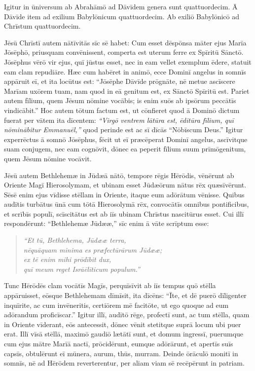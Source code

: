 \Versus Igitur in ūniversum ab Abrahāmō ad Dāvīdem genera sunt quattuordecim. Ā Dāvīde item ad exilium Babylōnicum quattuordecim. Ab exiliō Babylōnicō ad Chrīstum quattuordecim.

\Versus Jēsū Chrīstī autem nātīvitās sīc sē habet: Cum esset dēspōnsa māter ejus Marīa Jōsēphō, priusquam convēnissent, comperta est uterum ferre ex Spīritū Sānctō. 
\Versus Jōsē\-phus vērō vir ejus, quī jūstus esset, nec in eam vellet exemplum ēdere, statuit eam clam repudiāre. 
\Versus Hæc cum habēret in animō, ecce Dominī angelus in somnīs appāruit eī, et ita locūtus est: ``Jōsēphe Dāvīde prōgnāte, nē metue ascīscere Marīam uxōrem tuam, nam quod in eā genitum est, ex Sānctō Spīritū est. 
\Versus Pariet autem fīlium, quem Jēsum nōmine vocābis; is enim suōs ab ipsōrum peccātīs vindicābit.'' 
\Versus Hoc autem tōtum factum est, ut cōnfieret quod ā Dominō dictum fuerat per vātem ita dīcentem: 
\Versus \emph{``Virgō ventrem lātūra est, ēditūra fīlium, quī nōminābitur Emmanuēl,''} quod perinde est ac sī dīcās ``Nōbīscum Deus.'' 
\Versus Igitur experrēctus ā somnō Jōsēphus, fēcit ut eī præcēperat Dominī angelus, ascīvitque suam conjugem, 
\Versus nec eam cognōvit, dōnec ea peperit fīlium suum prīmōgenitum, quem Jēsum nōmine vocāvit.
 

\Caput
\Versus Jēsū autem Bethlehemæ in Jūdæā nātō, tempore rēgis Hērōdis, vēnērunt ab Oriente Magī Hierosolymam, 
\Versus et ubinam esset Jūdæōrum nātus rēx quæsīvērunt. Sēsē enim ejus vīdisse stēllam in Oriente, itaque eum adōrātum vēnisse. 
\Versus Quibus audītis turbātus ūnā cum tōtā Hierosolymā rēx, 
\Versus convocātīs omnibus pontificibus, et scrībīs populī, scīscitātus est ab iīs ubinam Chrīstus nascitūrus esset. 
\Versus Cui illī respondērunt: ``Bethlehemæ Jūdææ,'' sīc enim ā vāte scrīptum esse:

\begin{verse}
\begin{patverse*}
\Versus \emph{``Et tū, Bethlehema, Jūdææ terra,\\
nēquāquam minima es præfectūrārum Jūdææ;\\
ex tē enim mihi prōdībit dux,\\
quī meum reget Isrāēlīticum populum.''}
\end{patverse*}
\end{verse}

\Versus Tunc Hērōdēs clam vocātīs Magīs, perquīsīvit ab iīs tempus quō stēlla appāruisset, 
\Versus eōsque Bethlehemam dīmīsit, ita dīcēns: ``Īte, et dē puerō dīligenter inquīrite, ac cum invēneritis, certiōrem mē facitōte, ut ego quoque ad eum adōrandum proficīscar.'' 
\Versus Igitur illī, audītō rēge, profectī sunt, ac tum stēlla, quam in Oriente vīderant, eōs antecessit, dōnec vēnit stetitque suprā locum ubi puer erat. 
\Versus Illī vīsā stēllā, maximō gaudiō lætātī sunt, 
\Versus et domum ingressī, puerumque cum ejus mātre Marīā nactī, prōcidērunt, eumque adōrārunt, et apertīs suīs capsīs, obtulērunt eī mūnera, aurum, thūs, murram. 
\Versus Deinde ōrāculō monitī in somnīs, nē ad Hērōdem reverterentur, per aliam viam sē recēpērunt in patriam.

